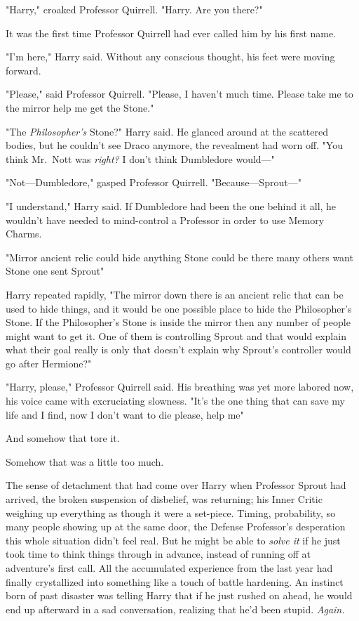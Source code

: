 "Harry," croaked Professor Quirrell. "Harry. Are you there?"

It was the first time Professor Quirrell had ever called him by his first name.

"I'm here," Harry said. Without any conscious thought, his feet were moving
forward.

"Please," said Professor Quirrell. "Please, I haven't{\el} much time. Please
take me{\el} to the mirror{\el} help me{\el} get the Stone."

"The \emph{Philosopher's} Stone?" Harry said. He glanced around at the
scattered bodies, but he couldn't see Draco anymore, the revealment had worn
off. "You think Mr.~Nott was \emph{right?} I don't think Dumbledore would—"

"Not—Dumbledore," gasped Professor Quirrell. "Because—Sprout—"

"I understand," Harry said. If Dumbledore had been the one behind it all, he
wouldn't have needed to mind-control a Professor in order to use Memory Charms.

"Mirror{\el} ancient relic{\el} could hide anything{\el} Stone could
be there{\el} many others want Stone{\el} one sent Sprout{\el}"

Harry repeated rapidly, "The mirror down there is an ancient relic that can be
used to hide things, and it would be one possible place to hide the
Philosopher's Stone. If the Philosopher's Stone is inside the mirror then any
number of people might want to get it. One of them is controlling Sprout and
that would explain what their goal really is{\el} only{\el} that doesn't
explain why Sprout's controller would go after Hermione?"

"Harry, please," Professor Quirrell said. His breathing was yet more labored
now, his voice came with excruciating slowness. "It's the one thing{\el}
that can save my life{\el} and I find, now{\el} I don't want to
die{\el} please, help me{\el}"

And somehow that tore it.

Somehow that was a little too much.

The sense of detachment that had come over Harry when Professor Sprout had
arrived, the broken suspension of disbelief, was returning; his Inner Critic
weighing up everything as though it were a set-piece. Timing, probability, so
many people showing up at the same door, the Defense Professor's
desperation{\el} this whole situation didn't feel real. But he might be able
to \emph{solve it} if he just took time to think things through in advance,
instead of running off at adventure's first call. All the accumulated
experience from the last year had finally crystallized into something like a
touch of battle hardening. An instinct born of past disaster was telling Harry
that if he just rushed on ahead, he would end up afterward in a sad
conversation, realizing that he'd been stupid. \emph{Again.}

